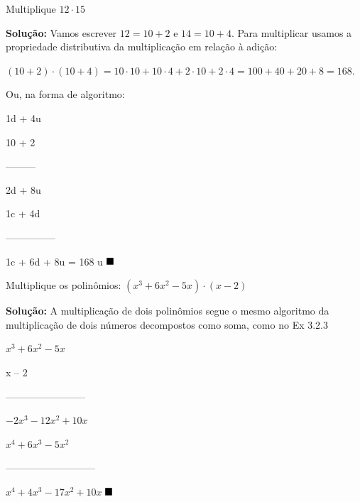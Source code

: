 \begin{texemplo}
Multiplique $12 \cdot 15$

\textbf{Solução: }
Vamos escrever $12 = 10 + 2$ e $14 = 10 + 4$. Para multiplicar usamos a propriedade distributiva da multiplicação em relação à adição:

$(10 + 2) \cdot  (10 + 4) = 10 \cdot 10 + 10 \cdot 4 + 2 \cdot 10 + 2 \cdot 4 = 100 + 40 + 20 + 8 = 168$.

Ou, na forma de algoritmo:

\hspace{7mm} 1d + 4u

\hspace{7mm} 10 + 2

\hspace{7mm} ---------

\hspace{7mm} 2d    + 8u

\hspace{-1mm} 1c  + 4d

            ---------------

            1c + 6d + 8u        = 168 u $\qedsymbol$


\end{texemplo}

\begin{texemplo}
Multiplique os polinômios: $(x^3 + 6x^2 - 5x) \cdot (x - 2)$

\textbf{Solução:}
A multiplicação de dois polinômios segue o mesmo algoritmo da multiplicação de dois números decompostos como soma, como no Ex 3.2.3

\hspace{8mm}$x^3 + 6x^2 - 5x$
                
\hspace{23mm}x – 2
		      			 
\hspace{4mm}------------------------
				
\hspace{4mm} $-2x^3 -12x^2  + 10x$
       		       	          
$x^4 +6x^3 -5x^2 $ 
		                
---------------------------

$x^4  +  4x^3  -17x^2  + 10x$ $\qedsymbol$
\end{texemplo}

